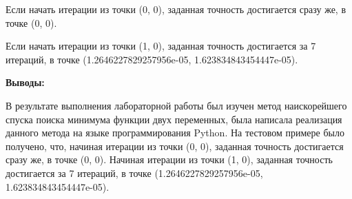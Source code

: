 \documentclass [12pt]{article}
\begin{document}
Если начать итерации из точки (0, 0), заданная точность достигается сразу же, в точке (0, 0).

Если начать итерации из точки (1, 0), заданная точность достигается за 7 итераций, в точке (1.2646227829257956e-05, 1.623834843454447e-05).

\textbf{Выводы:}

В результате выполнения лабораторной работы был изучен метод наискорейшего спуска поиска минимума функции двух переменных, была написала реализация данного метода на языке программирования Python. На тестовом примере было получено, что, начиная итерации из точки (0, 0), заданная точность достигается сразу же, в точке (0, 0). Начиная итерации из точки (1, 0), заданная точность достигается за 7 итераций, в точке (1.2646227829257956e-05, 1.623834843454447e-05).
\end{document}
